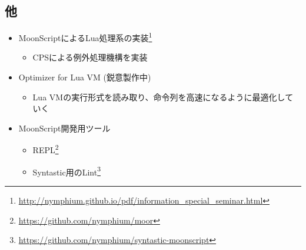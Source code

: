 \documentclass[aspectratio=169,unicode]{beamer}
\begin{document}
\subsection{他}
\begin{frame}
	\frametitlesubs
	\begin{itemize}
		\item MoonScriptによるLua処理系の実装\footnote{\url{http://nymphium.github.io/pdf/information_special_seminar.html}}
			\begin{itemize}
				\item CPSによる例外処理機構を実装
			\end{itemize}
		\item Optimizer for Lua VM (鋭意製作中)
			\begin{itemize}
				\item Lua VMの実行形式を読み取り、命令列を高速になるように最適化していく
			\end{itemize}
		\item MoonScript開発用ツール
			\begin{itemize}
				\item REPL\footnote{\url{https://github.com/nymphium/moor}}
				\item Syntastic用のLint\footnote{\url{https://github.com/nymphium/syntastic-moonscript}}
			\end{itemize}
	\end{itemize}
\end{frame}
\end{document}

